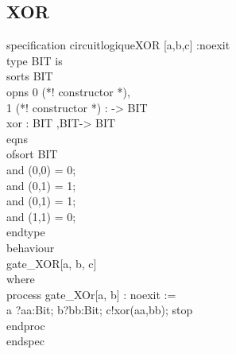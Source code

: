 \documentclass{article}
\begin{document}
    \subsection*{XOR}
    specification circuitlogiqueXOR [a,b,c] :noexit \\
    type BIT is \\
        sorts BIT\\
        opns 0 (*! constructor *), \\
            1 (*! constructor *) : -> BIT\\
        xor : BIT ,BIT-> BIT\\
        eqns \\
            ofsort BIT \\
            and (0,0) = 0; \\
            and (0,1) = 1; \\
            and (0,1) = 1; \\
            and (1,1) = 0; \\
    endtype\\ 
    behaviour\\ 
        gate_XOR[a, b, c]\\
    where \\
        process gate_XOr[a, b] : noexit :=\\ 
        a ?aa:Bit; b?bb:Bit;  c!xor(aa,bb); stop \\
        endproc \\
    endspec\\
\end{document}
